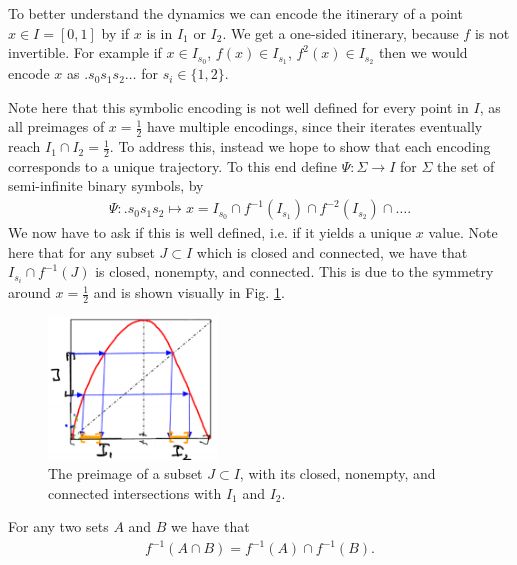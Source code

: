 \begin{ex}
To better understand the dynamics we can encode the itinerary of a point $x\in I=[0,1]$ by if $x$ is in $I_{1}$ or $I_{2}$. We get a one-sided itinerary, because $f$ is not invertible. For example if $x\in I_{s_0}$, $f(x)\in I_{s_1}$, $f^{2}(x)\in I_{s_2}$ then we would encode $x$ as $\bm{.} s_0s_1s_2\ldots$ for $s_i \in \{ 1,2\}$.

Note here that this symbolic encoding is not well defined for every point in $I$, as all preimages of $x=\frac{1}{2}$ have multiple encodings, since their iterates eventually reach $I_{1}\cap I_{2} =\frac{1}{2}$. To address this, instead we hope to show that each encoding corresponds to a unique trajectory. To this end define $\Psi:\Sigma \to I$ for $\Sigma$ the set of semi-infinite binary symbols, by
\begin{align}
	\Psi: \bm{.} s_0s_1s_2 \mapsto x = I_{s_0} \cap f^{-1}(I_{s_1}) \cap f^{-2}(I_{s_2}) \cap \ldots.
\end{align}
We now have to ask if this is well defined, i.e. if it yields a unique $x$ value. Note here that for any subset $J\subset I$ which is closed and connected, we have that $I_{s_i}\cap f^{-1}(J)$ is closed, nonempty, and connected. This is due to the symmetry around $x=\frac{1}{2}$ and is shown visually in Fig. \ref{fig:J_preimage}.
\begin{figure}[h!]
	\centering
	\includegraphics[width=0.4\textwidth]{figures/ch6/24J_preimage.png}
	\caption{The preimage of a subset $J\subset I$, with its closed, nonempty, and connected intersections with $I_1$ and $I_2$.}
	\label{fig:J_preimage}
\end{figure}

\begin{remark}[]
	For any two sets $A$ and $B$ we have that 
	\begin{align}
		f^{-1}(A \cap B) = f^{-1}(A) \cap f^{-1}(B).
	\end{align}
\end{remark}


\end{ex}

